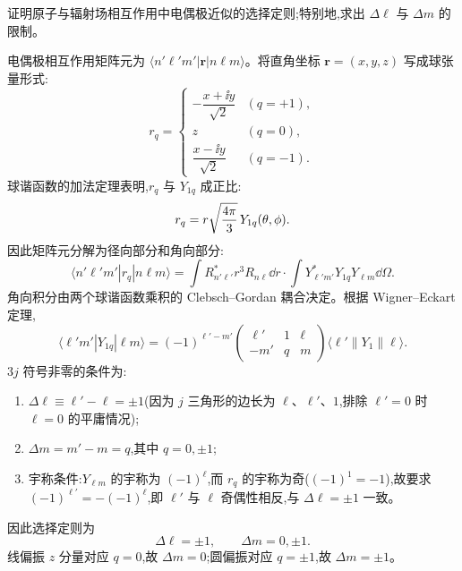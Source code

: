 \begin{question}
证明原子与辐射场相互作用中电偶极近似的选择定则;特别地,求出 $\Delta \ell$ 与 $\Delta m$ 的限制。
\end{question}
\begin{solution}
电偶极相互作用矩阵元为 $\langle n'\ell' m'|\mathbf r|n\ell m\rangle$。将直角坐标 $\mathbf r=(x,y,z)$ 写成球张量形式:
\[
r_q = \begin{cases}
-\dfrac{x+\ii y}{\sqrt2} & (q=+1),\\[4pt]
z & (q=0),\\[4pt]
\dfrac{x-\ii y}{\sqrt2} & (q=-1).
\end{cases}
\]
球谐函数的加法定理表明,$r_q$ 与 $Y_{1q}$ 成正比:
\[
r_q = r\sqrt{4\pi\over3}\,Y_{1q}(\theta,\phi).
\]
因此矩阵元分解为径向部分和角向部分:
\[
\langle n'\ell' m'|r_q|n\ell m\rangle
=\int R_{n'\ell'}^* r^3 R_{n\ell}\dd r
\cdot\int Y_{\ell'm'}^* Y_{1q}Y_{\ell m}\dd\Omega.
\]
角向积分由两个球谐函数乘积的 Clebsch--Gordan 耦合决定。根据 Wigner--Eckart 定理,
\[
\langle \ell' m'|Y_{1q}|\ell m\rangle
=(-1)^{\ell'-m'}\begin{pmatrix}\ell'&1&\ell\\ -m'&q&m\end{pmatrix}
\langle\ell'\|Y_1\|\ell\rangle.
\]
$3j$ 符号非零的条件为:
\begin{enumerate}
\item $\Delta\ell\equiv\ell'-\ell=\pm1$(因为 $j$ 三角形的边长为 $\ell$、$\ell'$、$1$,排除 $\ell'=0$ 时 $\ell=0$ 的平庸情况);
\item $\Delta m=m'-m=q$,其中 $q=0,\pm1$;
\item 宇称条件:$Y_{\ell m}$ 的宇称为 $(-1)^\ell$,而 $r_q$ 的宇称为奇($(-1)^1=-1$),故要求 $(-1)^{\ell'}=-(-1)^\ell$,即 $\ell'$ 与 $\ell$ 奇偶性相反,与 $\Delta\ell=\pm1$ 一致。
\end{enumerate}
因此选择定则为
\[
\boxed{\Delta\ell=\pm1,\qquad\Delta m=0,\pm1.}
\]
线偏振 $z$ 分量对应 $q=0$,故 $\Delta m=0$;圆偏振对应 $q=\pm1$,故 $\Delta m=\pm1$。
\end{solution}

